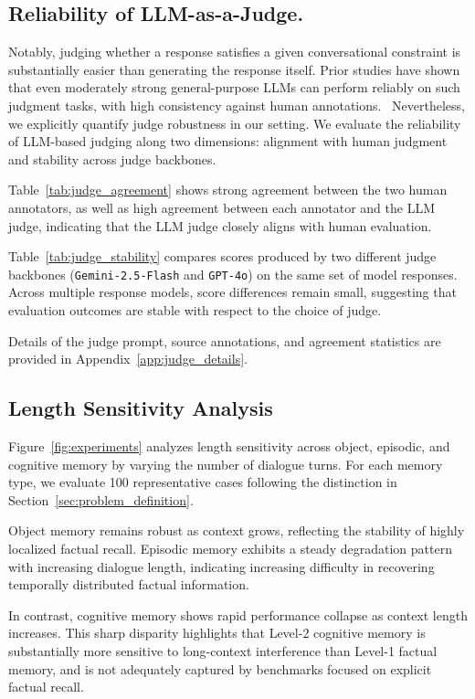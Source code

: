 \documentclass[11pt]{article}
\begin{document}
\subsection{Reliability of LLM-as-a-Judge.}

Notably, judging whether a response satisfies a given conversational
constraint is substantially easier than generating the response itself.
Prior studies have shown that even moderately strong general-purpose LLMs
can perform reliably on such judgment tasks, with high consistency against
human annotations.~\cite{zheng2023judging,thakur2025judging}
Nevertheless, we explicitly quantify judge robustness in our setting.
We evaluate the reliability of LLM-based judging along two dimensions:
alignment with human judgment and stability across judge backbones.

Table~\ref{tab:judge_agreement} shows strong agreement between the two human annotators, as well as high agreement between each annotator and the LLM judge, indicating that
the LLM judge closely aligns with human evaluation.

Table~\ref{tab:judge_stability} compares scores produced by two different
judge backbones (\texttt{Gemini-2.5-Flash} and \texttt{GPT-4o}) on the same
set of model responses.
Across multiple response models, score differences remain small, suggesting
that evaluation outcomes are stable with respect to the choice of judge.

Details of the judge prompt, source annotations, and agreement statistics
are provided in Appendix~\ref{app:judge_details}.


\subsection{Length Sensitivity Analysis}

Figure~\ref{fig:experiments} analyzes length sensitivity across object,
episodic, and cognitive memory by varying the number of dialogue turns.
For each memory type, we evaluate 100 representative cases following the
distinction in Section~\ref{sec:problem_definition}.

Object memory remains robust as context grows, reflecting the stability of
highly localized factual recall.
Episodic memory exhibits a steady degradation pattern with increasing
dialogue length, indicating increasing difficulty in recovering
temporally distributed factual information.

In contrast, cognitive memory shows rapid performance collapse as context
length increases.
This sharp disparity highlights that Level-2 cognitive memory is
substantially more sensitive to long-context interference than Level-1
factual memory, and is not adequately captured by benchmarks focused on
explicit factual recall.
\end{document}
